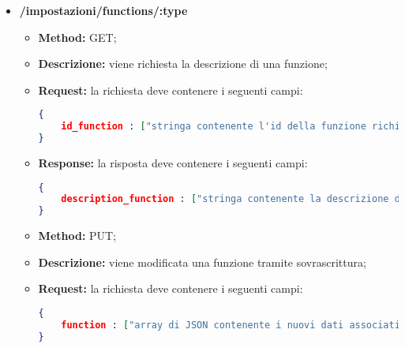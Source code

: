 \begin{itemize}
\item \textbf{/impostazioni/functions/:type}\\

\begin{itemize}
\item \textbf{Method:} GET;
\item \textbf{Descrizione:} viene richiesta la descrizione di una funzione;
\item \textbf{Request:} la richiesta deve contenere i seguenti campi:
\begin{lstlisting}[language=json,firstnumber=1]
{
	id_function : ["stringa contenente l'id della funzione richiesta"]
}
\end{lstlisting}
\item \textbf{Response:} la risposta deve contenere i seguenti campi:
\begin{lstlisting}[language=json,firstnumber=1]
{
	description_function : ["stringa contenente la descrizione della funzione richiesta"]
}
\end{lstlisting}
\end{itemize}

\begin{itemize}
\item \textbf{Method:} PUT;
\item \textbf{Descrizione:} viene modificata una funzione tramite sovrascrittura;
\item \textbf{Request:} la richiesta deve contenere i seguenti campi:
\begin{lstlisting}[language=json,firstnumber=1]
{
	function : ["array di JSON contenente i nuovi dati associati alla funzione da modificare"]
}
\end{lstlisting}

\end{itemize}

\end{itemize}




